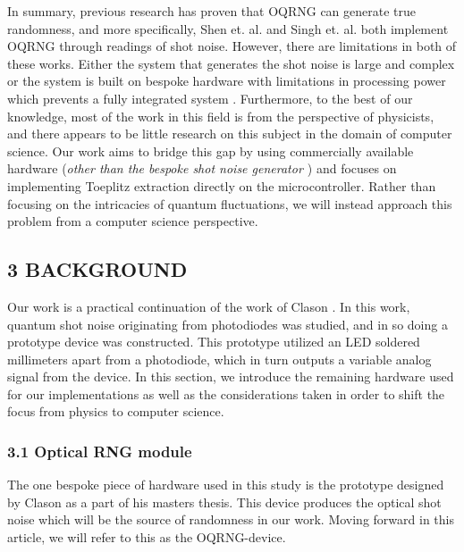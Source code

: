In summary, previous research has proven that OQRNG can generate true randomness, and more specifically, Shen et. al. \cite{contender1} and Singh et. al. \cite{singh} both implement OQRNG through readings of shot noise. However, there are limitations in both of these works. Either the system that generates the shot noise is large and complex \cite{contender1} or the system is built on bespoke hardware with limitations in processing power which prevents a fully integrated system \cite{singh}. Furthermore, to the best of our knowledge, most of the work in this field is from the perspective of physicists, and there appears to be little research on this subject in the domain of computer science. Our work aims to bridge this gap by using commercially available hardware (\emph{other than the bespoke shot noise generator \cite{Clason2023}}) and focuses on implementing Toeplitz extraction directly on the microcontroller. Rather than focusing on the intricacies of quantum fluctuations, we will instead approach this problem from a computer science perspective.

\hypertarget{background}{%
\subsection{3 BACKGROUND}\label{background}}

Our work is a practical continuation of the work of Clason \cite{Clason2023}. In this work, quantum shot noise originating from photodiodes was studied, and in so doing a prototype device was constructed. This prototype utilized an LED soldered millimeters apart from a photodiode, which in turn outputs a variable analog signal from the device. In this section, we introduce the remaining hardware used for our implementations as well as the considerations taken in order to shift the focus from physics to computer science.

\hypertarget{optical-rng-module}{%
\subsubsection{3.1 Optical RNG module}\label{optical-rng-module}}

The one bespoke piece of hardware used in this study is the prototype designed by Clason \cite{Clason2023} as a part of his masters thesis. This device produces the optical shot noise which will be the source of randomness in our work. Moving forward in this article, we will refer to this as the OQRNG-device.

